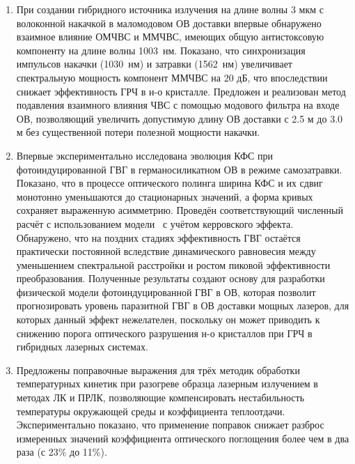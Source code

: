 \begin{enumerate}
  \item При создании гибридного источника излучения на длине волны 3 мкм с волоконной накачкой в маломодовом ОВ доставки впервые обнаружено взаимное влияние ОМЧВС и ММЧВС, имеющих общую антистоксовую компоненту на длине волны 1003~нм. Показано, что синхронизация импульсов накачки (1030~нм) и затравки (1562~нм) увеличивает спектральную мощность компонент ММЧВС на 20 дБ, что впоследствии снижает эффективность ГРЧ в н-о кристалле. Предложен и реализован метод подавления взаимного влияния ЧВС с помощью модового фильтра на входе ОВ, позволяющий увеличить допустимую длину ОВ доставки с 2.5 м до 3.0 м без существенной потери полезной мощности накачки.
  \item Впервые экспериментально исследована эволюция КФС при фотоиндуцированной ГВГ в германосиликатном ОВ в режиме самозатравки. Показано, что в процессе оптического полинга ширина КФС и их сдвиг монотонно уменьшаются до стационарных значений, а форма кривых сохраняет выраженную асимметрию. Проведён соответствующий численный расчёт с использованием модели~\cite{antonyuk2001self} с учётом керровского эффекта. Обнаружено, что на поздних стадиях эффективность ГВГ остаётся практически постоянной вследствие динамического равновесия между уменьшением спектральной расстройки и ростом пиковой эффективности преобразования. Полученные результаты создают основу для разработки физической модели фотоиндуцированной ГВГ в ОВ, которая позволит прогнозировать уровень паразитной ГВГ в ОВ доставки мощных лазеров, для которых данный эффект нежелателен, поскольку он может приводить к снижению порога оптического разрушения н-о кристаллов при ГРЧ в гибридных лазерных системах.
  \item Предложены поправочные выражения для трёх методик обработки температурных кинетик при разогреве образца лазерным излучением в методах ЛК и ПРЛК, позволяющие компенсировать нестабильность температуры окружающей среды и коэффициента теплоотдачи. Экспериментально показано, что применение поправок снижает разброс измеренных значений коэффициента оптического поглощения более чем в два раза (с 23\% до 11\%).
\end{enumerate}

